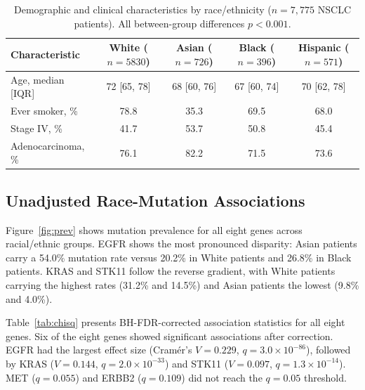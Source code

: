 \documentclass[12pt]{article}
\begin{document}
\begin{table}[H]
\centering
\caption{Demographic and clinical characteristics by race/ethnicity
         ($n = 7{,}775$ NSCLC patients).
         All between-group differences $p < 0.001$.}
\label{tab:demo}
\begin{tabular}{lcccc}
\toprule
\textbf{Characteristic}
  & \textbf{White} ($n{=}5830$)
  & \textbf{Asian} ($n{=}726$)
  & \textbf{Black} ($n{=}396$)
  & \textbf{Hispanic} ($n{=}571$) \\
\midrule
Age, median [IQR]    & 72 [65, 78] & 68 [60, 76] & 67 [60, 74] & 70 [62, 78] \\
Ever smoker, \%      & 78.8        & 35.3        & 69.5        & 68.0        \\
Stage IV, \%         & 41.7        & 53.7        & 50.8        & 45.4        \\
Adenocarcinoma, \%   & 76.1        & 82.2        & 71.5        & 73.6        \\
\bottomrule
\end{tabular}
\end{table}

\subsection{Unadjusted Race-Mutation Associations}

Figure~\ref{fig:prev} shows mutation prevalence for all eight genes across
racial/ethnic groups.
EGFR shows the most pronounced disparity: Asian patients carry a 54.0\%
mutation rate versus 20.2\% in White patients and 26.8\% in Black patients.
KRAS and STK11 follow the reverse gradient, with White patients carrying the
highest rates (31.2\% and 14.5\%) and Asian patients the lowest
(9.8\% and 4.0\%).

Table~\ref{tab:chisq} presents BH-FDR-corrected association statistics for
all eight genes.
Six of the eight genes showed significant associations after correction.
EGFR had the largest effect size (Cram\'{e}r's $V = 0.229$,
$q = 3.0 \times 10^{-86}$), followed by KRAS ($V = 0.144$,
$q = 2.0 \times 10^{-33}$) and STK11 ($V = 0.097$,
$q = 1.3 \times 10^{-14}$).
MET ($q = 0.055$) and ERBB2 ($q = 0.109$) did not reach the $q = 0.05$
threshold.
\end{document}
